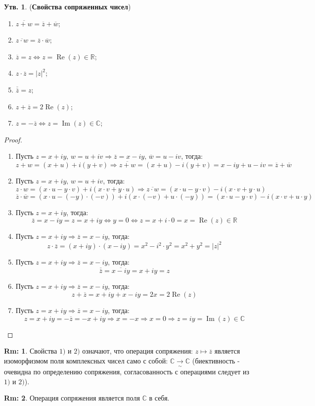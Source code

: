 \documentclass[12pt]{article}
\newcommand{\MR}{\mathbb{R}}
\newcommand{\MC}{\mathbb{C}}
\theoremstyle{definition}
\newtheorem{rem}{Rm:}
\newtheorem{prop}{Утв.}
\newcommand{\ovl}[1]{\overline{#1}}
\DeclareMathOperator{\IM}{\operatorname{Im}}
\DeclareMathOperator{\RE}{\operatorname{Re}}
\begin{document}
\begin{prop}(\textbf{Свойства сопряженных чисел})
	\begin{enumerate}[label=\arabic*)]
		\item $\ovl{z + w} = \ovl{z} + \ovl{w}$;
		\item $\ovl{z{\cdot}w} = \ovl{z}{\cdot}\ovl{w}$;
		\item $\ovl{z} = z \Leftrightarrow z = \RE(z) \in \MR$;
		\item $z{\cdot}\ovl{z} = |z|^2$;
		\item $\ovl{\ovl{z}} = z$;
		\item $z + \ovl{z} = 2\RE{(z)}$;
		\item $z = -\ovl{z} \Leftrightarrow z = \IM(z) \in \MC$;
	\end{enumerate}
\end{prop}
\begin{proof}\hfill
	\begin{enumerate}[label=\arabic*)]
		\item Пусть $z = x + iy, \, w = u + iv \Rightarrow \ovl{z} = x -iy, \, \ovl{w} = u - iv$, тогда:
		$$
			z+w = (x + u) + i(y + v) \Rightarrow \ovl{z+w} = (x+u) - i(y + v) = x -iy + u - iv = \ovl{z} + \ovl{w}
		$$
		\item Пусть $z = x + iy, \, w = u + iv$, тогда:
		$$
			z{\cdot}w = (x{\cdot}u - y{\cdot}v) + i(x{\cdot}v + y{\cdot}u) \Rightarrow \ovl{z{\cdot}w} = (x{\cdot}u - y{\cdot}v) - i(x{\cdot}v + y{\cdot}u)
		$$
		$$
			\ovl{z}{\cdot}\ovl{w} = (x{\cdot}u - (-y){\cdot}(-v)) + i(x{\cdot}(-v) + u{\cdot}(-y))= (x{\cdot}u - y{\cdot}v) - i(x{\cdot}v + u{\cdot}y)
		$$
		\item Пусть $z = x + iy$, тогда:
		$$
			\ovl{z} = x - iy = z = x + iy \Leftrightarrow y = 0 \Leftrightarrow z = x + i{\cdot}0 = x = \RE(z)\in \MR
		$$
		\item Пусть $z = x + iy \Rightarrow \ovl{z} = x - iy$, тогда:
		$$
			z{\cdot}\ovl{z} = (x + iy){\cdot}(x - iy) = x^2 - i^2{\cdot}y^2 = x^2 + y^2 = |z|^2 
		$$
		\item Пусть $z = x + iy \Rightarrow \ovl{z} = x - iy$, тогда:
		$$
			\ovl{\ovl{z}} = \ovl{x - iy} = x + iy = z
		$$
		\item Пусть $z = x + iy \Rightarrow \ovl{z} = x - iy$, тогда:
		$$
			z + \ovl{z} = x + iy + x - iy = 2x = 2\RE(z)
		$$
		\item Пусть $z = x + iy \Rightarrow \ovl{z} = x - iy$, тогда:
		$$
			z = x + iy = - \ovl{z} = - x + iy \Rightarrow x = - x \Rightarrow  x =0 \Rightarrow z = iy = \IM(z) \in \MC
		$$
	\end{enumerate}
\end{proof}
\begin{rem}
	Свойства $1)$ и $2)$ означают, что операция сопряжения: $z \mapsto \ovl{z}$ является изоморфизмом поля комплексных чисел само с собой: $\MC \xrightarrow[\sim]{} \MC$ (биективность - очевидна по определению сопряжения, согласованность с операциями следует из $1)$ и $2)$).
\end{rem}
\begin{rem}
	Операция сопряжения является  поля $\MC$ в себя.
\end{rem}
\end{document}
